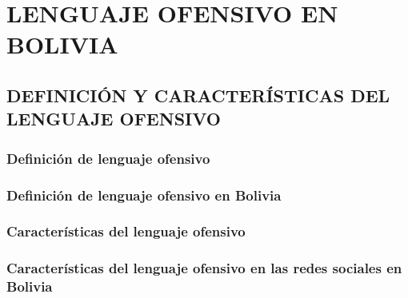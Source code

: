 \chapter{LENGUAJE OFENSIVO EN BOLIVIA}\label{chp-diseno}

\section{ DEFINICIÓN Y CARACTERÍSTICAS DEL LENGUAJE OFENSIVO}

\subsection{Definición de lenguaje ofensivo}

\subsection{Definición de lenguaje ofensivo en Bolivia}

\subsection{Características del lenguaje ofensivo}

\subsection{Características del lenguaje ofensivo en las redes sociales en Bolivia}

	